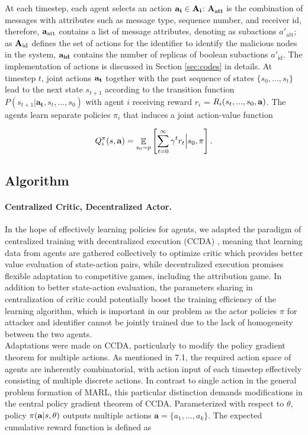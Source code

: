 \documentclass[a4paper,11pt]{article}
\DeclareMathOperator{\E}{\mathbb{E}}
\begin{document}
At each timestep, each agent selects an action $\bf{a_i} \in \bf{A_i}$: $\mathbf{A_{\text{att}}}$ is the combination of messages with attributes such as message type, sequence number, and receiver id, therefore, $\bf{a_{\text{att}}}$ contains a list of message attributes, denoting as subactions $a'_{\text{att}}$; as $\bf{A_{\text{id}}}$ defines the set of actions for the identifier to identify the malicious nodes in the system, $\bf{a_{id}}$ contains the number of replicas of boolean subactions $a'_{\text{id}}$. The implementation of actions is discussed in Section \ref{sec:codes} in details. At timestep $t$, joint actions $\bf{a_t}$ together with the past sequence of states $\{s_0, ..., s_{t}\}$ lead to the next state $s_{t+1}$ according to the transition function $P(s_{t+1}|\mathbf{a_t}, s_{t}, ..., s_0)$ with agent $i$ receiving reward $r_i$ = $R_i(s_{t}, ..., s_0,\bf{a})$. The agents learn separate policies $\pi_i$ that induces a joint action-value function


\begin{align}
    Q^{\pi}_{i}(s,{\bf{a}})=\E_{s_0 \sim p}\left[\sum_{t=0}^{\infty}\gamma^tr_t\Big\vert s_0, \bf{\pi}\right].
\end{align} 

\subsection{Algorithm}
\paragraph{Centralized Critic, Decentralized Actor.} In the hope of effectively learning policies for agents, we adapted the paradigm of centralized training with decentralized execution (CCDA) \cite{SIMOES202040}, meaning that learning data from agents are gathered collectively to optimize critic which provides better value evaluation of state-action pairs, while decentralized execution promises flexible adaptation to competitive games, including the attribution game. In addition to better state-action evaluation, the parameters sharing in centralization of critic could potentially boost the training efficiency of the learning algorithm, which is important in our problem as the actor policies $\pi$ for attacker and identifier cannot be jointly trained due to the lack of homogeneity between the two agents.\\

Adaptations were made on CCDA, particularly to modify the policy gradient theorem for multiple actions. As mentioned in 7.1, the required action space of agents are inherently combinatorial, with action input of each timestep effectively consisting of multiple discrete actions. In contrast to single action in the general problem formation of MARL, this particular distinction demands modifications in the central policy gradient theorem of CCDA. Parameterized with respect to $\theta$, policy $\pi({\bf{a}}|s, \theta)$ outputs multiple actions $\mathbf{a} = \{a_1, ..., a_k\}$. The expected cumulative reward function is defined as
\end{document}
